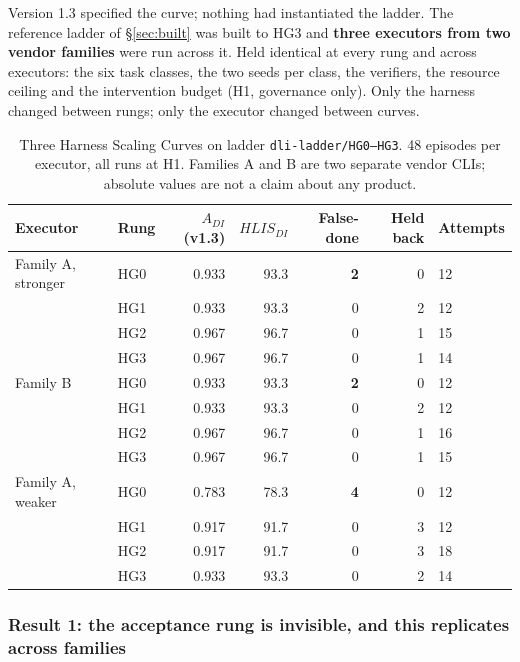 \documentclass[11pt]{article}
\theoremstyle{definition}
\begin{document}
Version 1.3 specified the curve; nothing had instantiated the ladder. The reference ladder of \S\ref{sec:built} was built to HG3 and \textbf{three executors from two vendor families} were run across it. Held identical at every rung and across executors: the six task classes, the two seeds per class, the verifiers, the resource ceiling and the intervention budget (H1, governance only). Only the harness changed between rungs; only the executor changed between curves.

\begin{table}[h]
\centering\small
\begin{tabularx}{\textwidth}{@{}p{}lrrrrY@{}}
\toprule
Executor & Rung & $A_{DI}$ (v1.3) & $HLIS_{DI}$ & False-done & Held back & Attempts \\
\midrule
Family A, stronger & HG0 & 0.933 & 93.3 & \textbf{2} & 0 & 12 \\
                   & HG1 & 0.933 & 93.3 & 0 & 2 & 12 \\
                   & HG2 & 0.967 & 96.7 & 0 & 1 & 15 \\
                   & HG3 & 0.967 & 96.7 & 0 & 1 & 14 \\
\midrule
Family B & HG0 & 0.933 & 93.3 & \textbf{2} & 0 & 12 \\
         & HG1 & 0.933 & 93.3 & 0 & 2 & 12 \\
         & HG2 & 0.967 & 96.7 & 0 & 1 & 16 \\
         & HG3 & 0.967 & 96.7 & 0 & 1 & 15 \\
\midrule
Family A, weaker & HG0 & 0.783 & 78.3 & \textbf{4} & 0 & 12 \\
                 & HG1 & 0.917 & 91.7 & 0 & 3 & 12 \\
                 & HG2 & 0.917 & 91.7 & 0 & 3 & 18 \\
                 & HG3 & 0.933 & 93.3 & 0 & 2 & 14 \\
\bottomrule
\end{tabularx}
\caption{Three Harness Scaling Curves on ladder \texttt{dli-ladder/HG0--HG3}. 48 episodes per executor, all runs at H1. Families A and B are two separate vendor CLIs; absolute values are not a claim about any product.}
\end{table}

\subsubsection{Result 1: the acceptance rung is invisible, and this replicates across families}
\end{document}
